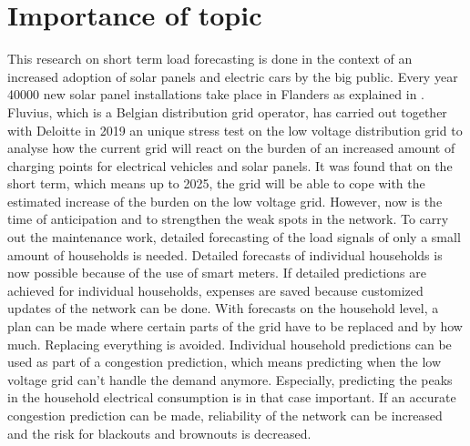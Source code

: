 \section{Importance of topic}
This research on short term load forecasting is done in the context of an increased adoption of solar panels and electric cars by the big public. Every year 40000 new solar panel installations take place in Flanders as explained in \cite{Lemmens2019}. Fluvius, which is a Belgian distribution grid operator, has carried out together with Deloitte in 2019 an unique stress test on the low voltage distribution grid to analyse how the current grid will react on the burden of an increased amount of charging points for electrical vehicles and solar panels. It was found that on the short term, which means up to 2025, the grid will be able to cope with the estimated increase of the burden on the low voltage grid. However, now is the time of anticipation and to strengthen the weak spots in the network. To carry out the maintenance work, detailed forecasting of the load signals of only a small amount of households is needed. Detailed forecasts of individual households is now possible because of the use of smart meters. If detailed predictions are achieved for individual households, expenses are saved because customized updates of the network can be done. With forecasts on the household level, a plan can be made where certain parts of the grid have to be replaced and by how much. Replacing everything is avoided. Individual household predictions can be used as part of a congestion prediction, which means predicting when the low voltage grid can't handle the demand anymore. Especially, predicting the peaks in the household electrical consumption is in that case important. If an accurate congestion prediction can be made, reliability of the network can be increased and the risk for blackouts and brownouts is decreased.\\

